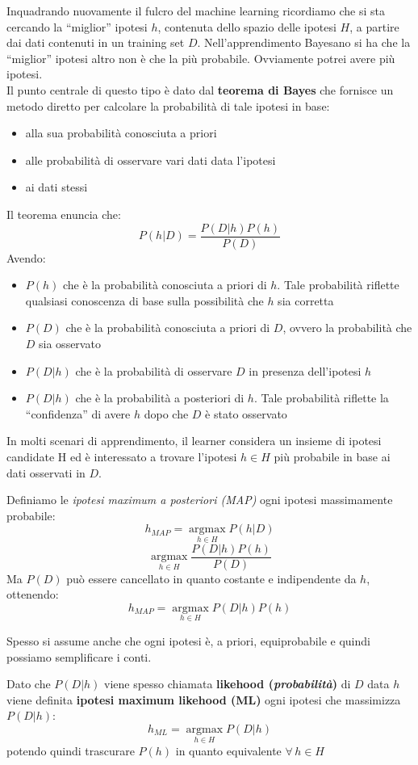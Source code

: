 \documentclass[a4paper,12pt, oneside]{book}
\begin{document}
Inquadrando nuovamente il fulcro del machine learning ricordiamo che si sta
cercando la ``miglior'' ipotesi $h$, contenuta dello spazio delle ipotesi $H$, a
partire dai dati contenuti in un training set $D$. Nell'apprendimento Bayesano
si ha che la ``miglior'' ipotesi altro non è che la più probabile. Ovviamente
potrei avere più ipotesi.\\
Il punto centrale di questo tipo è dato dal \textbf{teorema di Bayes} che
fornisce un metodo diretto per calcolare la probabilità di tale ipotesi in base:
\begin{itemize}
  \item alla sua probabilità conosciuta a priori
  \item alle probabilità di osservare vari dati data l'ipotesi
  \item ai dati stessi
\end{itemize}
\begin{teorema}
  Il teorema enuncia che:
  \[P(h|D)=\frac{P(D|h)P(h)}{P(D)}\]
  Avendo:
  \begin{itemize}
    \item $P(h)$ che è la probabilità conosciuta a priori di $h$. Tale
    probabilità riflette qualsiasi conoscenza di base sulla possibilità
    che $h$ sia corretta  
    \item $P(D)$ che è la probabilità conosciuta a priori di $D$, ovvero la
    probabilità che $D$ sia osservato
    \item $P(D|h)$ che è la probabilità di osservare $D$ in presenza
    dell'ipotesi $h$
    \item $P(D|h)$ che è la probabilità a posteriori di $h$. Tale probabilità
    riflette la ``confidenza'' di avere $h$  dopo che $D$ è stato osservato
  \end{itemize}
\end{teorema}
In molti scenari di apprendimento, il learner considera un insieme di ipotesi
candidate H ed è interessato a trovare l'ipotesi $h\in H$ più probabile in base
ai dati osservati in $D$.
\begin{definizione}
  Definiamo le \textit{ipotesi maximum a posteriori (MAP)} ogni ipotesi
  massimamente probabile:
  \[h_{MAP}=\operatorname*{argmax}_{h\in H}P(h|D)\]
  \[\operatorname*{argmax}_{h\in H}\frac{P(D|h)P(h)}{P(D)}\]
  Ma $P(D)$ può essere cancellato in quanto costante e indipendente da $h$,
  ottenendo:
  \[h_{MAP}=\operatorname*{argmax}_{h\in H}P(D|h)P(h)\]
\end{definizione}
Spesso si assume anche che ogni ipotesi è, a priori, equiprobabile e quindi
possiamo semplificare i conti.
\begin{definizione}
  Dato che $P(D|h)$ viene spesso chiamata \textbf{likehood
    (\textit{probabilità})} di $D$ data $h$ viene definita \textbf{ipotesi
    maximum likehood (ML)} ogni ipotesi che massimizza $P(D|h)$:
  \[h_{ML}=\operatorname*{argmax}_{h\in H}P(D|h)\]
  potendo quindi trascurare $P(h)$ in quanto equivalente $\forall\,h\in H$
\end{definizione}
\end{document}
